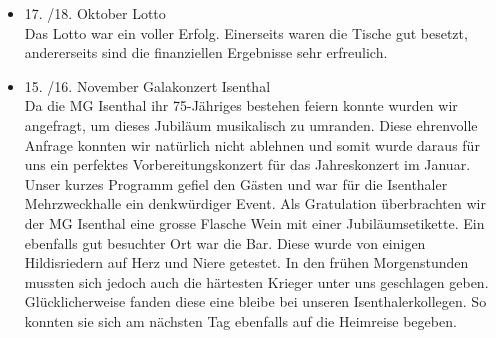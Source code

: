 \begin{history}
\begin{itemize}
        \item 17. /18. Oktober Lotto\\
              Das Lotto war ein voller Erfolg. Einerseits waren die Tische gut
              besetzt, andererseits sind die finanziellen Ergebnisse sehr erfreulich.

        \item 15. /16. November Galakonzert Isenthal\\
              Da die MG Isenthal ihr 75-Jähriges bestehen feiern konnte wurden wir
              angefragt, um dieses Jubiläum musikalisch zu umranden. Diese ehrenvolle
              Anfrage konnten wir natürlich nicht ablehnen und somit wurde daraus für
              uns ein perfektes Vorbereitungskonzert für das Jahreskonzert im Januar.
              Unser kurzes Programm gefiel den Gästen und war für die Isenthaler
              Mehrzweckhalle ein denkwürdiger Event. Als Gratulation überbrachten wir
              der MG Isenthal eine grosse Flasche Wein mit einer Jubiläumsetikette.
              Ein ebenfalls gut besuchter Ort war die Bar. Diese wurde von einigen
              Hildisriedern auf Herz und Niere getestet. In den frühen Morgenstunden
              mussten sich jedoch auch die härtesten Krieger unter uns geschlagen
              geben. Glücklicherweise fanden diese eine bleibe bei unseren
              Isenthalerkollegen. So konnten sie sich am nächsten Tag ebenfalls auf
              die Heimreise begeben.


    \end{itemize}

\end{history}
